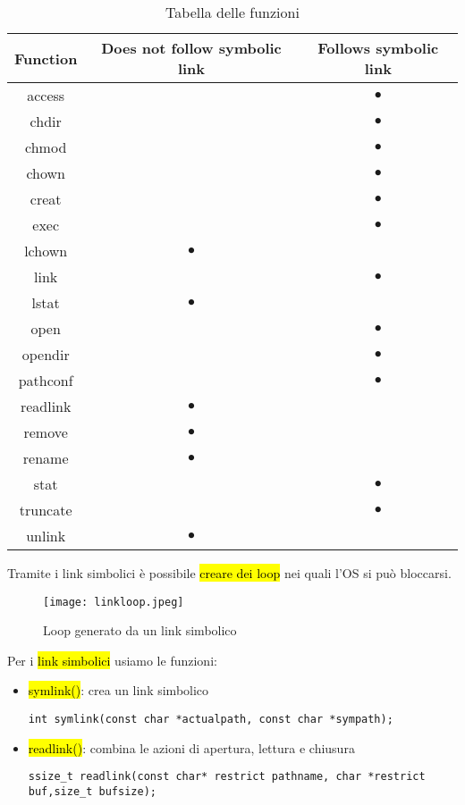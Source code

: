 \begin{table}[!h]
    \centering
    \begin{tabular}{|c|c|c|}
        \hline
        \textbf{Function} & \textbf{Does not follow symbolic link} & \textbf{Follows symbolic link} \\\hline\hline
        access &  & $\bullet$ \\\hline
        chdir &  & $\bullet$ \\\hline
        chmod &  & $\bullet$ \\\hline
        chown &  & $\bullet$ \\\hline
        creat &  & $\bullet$ \\\hline
        exec &  & $\bullet$ \\\hline
        lchown & $\bullet$ &  \\\hline
        link &  & $\bullet$ \\\hline
        lstat & $\bullet$ &  \\\hline
        open &  & $\bullet$ \\\hline
        opendir &  & $\bullet$ \\\hline
        pathconf &  & $\bullet$ \\\hline
        readlink & $\bullet$ &  \\\hline
        remove & $\bullet$ &  \\\hline
        rename & $\bullet$ &  \\\hline
        stat &  & $\bullet$ \\\hline
        truncate &  & $\bullet$ \\\hline
        unlink & $\bullet$ & \\\hline
    \end{tabular}
    \caption{\label{tab:widgets}Tabella delle funzioni}
\end{table}


Tramite i link simbolici è possibile \hl{creare dei loop} nei quali l'OS si può bloccarsi. 


\begin{figure}[H]
\centering
\texttt{[image: linkloop.jpeg]}
\caption{Loop generato da un link simbolico} 
\label{linkloop}
\end{figure}


Per i \hl{link simbolici} usiamo le funzioni:

\begin{itemize}
	\item \hl{symlink()}: crea un link simbolico

\begin{lstlisting}
int symlink(const char *actualpath, const char *sympath);
\end{lstlisting}

	\item \hl{readlink()}: combina le azioni di apertura, lettura e chiusura

\begin{lstlisting}
ssize_t readlink(const char* restrict pathname, char *restrict buf,size_t bufsize);
\end{lstlisting}

\end{itemize}


